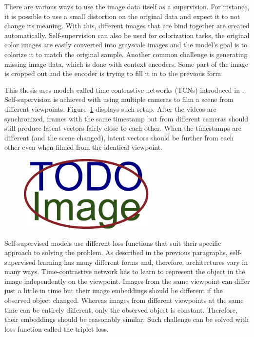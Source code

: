 There are various ways to use the image data itself as a supervision. For instance, it is possible to use a small distortion on the original data and expect it to not change its meaning. With this, different images that are bind together are created automatically. Self-supervision can also be used for colorization tasks, the original color images are easily converted into grayscale images and the model's goal is to colorize it to match the original sample. Another common challenge is generating missing image data, which is done with context encoders. Some part of the image is cropped out and the encoder is trying to fill it in to the previous form.

This thesis uses models called time-contrastive networks (TCNs) introduced in \cite{sermanet2018timecontrastive}. Self-supervision is achieved with using multiple cameras to film a scene from different viewpoints, Figure~\ref{fig:multiple-viewpoints} displays such setup. After the videos are synchronized, frames with the same timestamp but from different cameras should still produce latent vectors fairly close to each other. When the timestamps are different (and the scene changed), latent vectors should be further from each other even when filmed from the identical viewpoint.

\begin{figure}[ht]\centering
    \centering
    \includegraphics[width=0.5\linewidth,height=1.5in]{figures/placeholder.pdf}
    \caption{}
    \label{fig:multiple-viewpoints}
\end{figure}

Self-supervised models use different loss functions that suit their specific approach to solving the problem. As described in the previous paragraphs, self-supervised learning has many different forms and, therefore, architectures vary in many ways. Time-contrastive network has to learn to represent the object in the image independently on the viewpoint. Images from the same viewpoint can differ just a little in time but their image embeddings should be different if the observed object changed. Whereas images from different viewpoints at the same time can be entirely different, only the observed object is constant. Therefore, their embeddings should be reasonably similar. Such challenge can be solved with loss function called the triplet loss.

